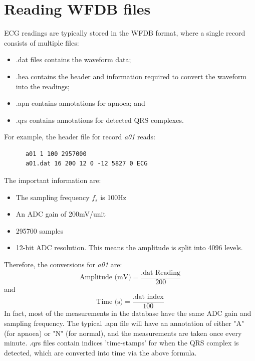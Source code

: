 \section{Reading WFDB files}
ECG readings are typically stored in the WFDB format, where a single record consists of multiple files:

\begin{itemize}
      \item .dat files contains the waveform data;
      \item .hea contains the header and information required to convert the waveform into the readings;
      \item .apn contains annotations for apnoea; and 
      \item .qrs contains annotations for detected QRS complexes.
\end{itemize}
For example, the header file for record \textit{a01} reads:
\begin{verbatim}
      a01 1 100 2957000
      a01.dat 16 200 12 0 -12 5827 0 ECG
\end{verbatim}
The important information are:
\begin{itemize}
      \item The sampling frequency $f_s$ is 100Hz
      \item An ADC gain of 200mV/unit
      \item 295700 samples
      \item 12-bit ADC resolution. This means the amplitude is split into 4096 levels.
\end{itemize}
Therefore, the conversions for \textit{a01} are:
\begin{equation*}
      \text{Amplitude (mV)} = \frac{\text{.dat Reading}}{200}
\end{equation*}
and
\begin{equation*}
      \text{Time (s)} = \frac{\text{.dat index}}{100}
\end{equation*}
In fact, most of the measurements in the database have the same ADC gain and sampling frequency. \nl
The typical .apn file will have an annotation of either "A" (for apnoea) or "N" (for normal), and the measurements are taken once every minute. .qrs files contain indices 'time-stamps' for when the QRS complex is detected, which are converted into time via the above formula.

